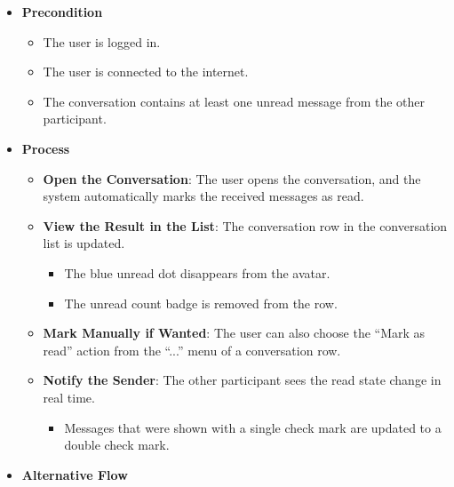\begin{itemize}[leftmargin=1.6em,topsep=4pt,itemsep=3pt,parsep=0pt,label=$\bullet$]
    \item \textbf{Precondition}

        \begin{itemize}[leftmargin=2.2em,topsep=2pt,itemsep=3pt,parsep=0pt,label=$\circ$]
            \item The user is logged in.
            \item The user is connected to the internet.
            \item The conversation contains at least one unread message from the other participant.
        \end{itemize}
    \item \textbf{Process}

        \begin{itemize}[leftmargin=2.2em,topsep=2pt,itemsep=3pt,parsep=0pt,label=$\circ$]
            \item \textbf{Open the Conversation}: The user opens the conversation, and the system automatically marks the received messages as read.
            \item \textbf{View the Result in the List}: The conversation row in the conversation list is updated.
                \begin{itemize}[leftmargin=2.2em,topsep=2pt,itemsep=3pt,parsep=0pt,label=$\blacksquare$]
                    \item The blue unread dot disappears from the avatar.
                    \item The unread count badge is removed from the row.
                \end{itemize}
            \item \textbf{Mark Manually if Wanted}: The user can also choose the ``Mark as read'' action from the ``...'' menu of a conversation row.
            \item \textbf{Notify the Sender}: The other participant sees the read state change in real time.
                \begin{itemize}[leftmargin=2.2em,topsep=2pt,itemsep=3pt,parsep=0pt,label=$\blacksquare$]
                    \item Messages that were shown with a single check mark are updated to a double check mark.
                \end{itemize}
        \end{itemize}
    \item \textbf{Alternative Flow}


\end{itemize}
